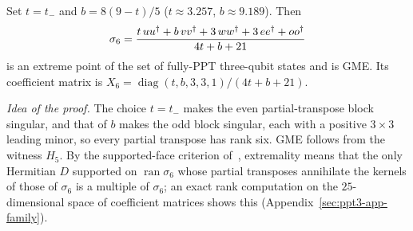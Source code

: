 \begin{corollary}\label{cor:ppt3-extreme6}
Set $t=t_-$ and $b=8(9-t)/5$ ($t\approx3.257$, $b\approx9.189$). Then
\begin{equation}\label{eq:ppt3-sigma6}
\sigma_6=\frac{t\,uu^{\dagger}+b\,vv^{\dagger}+3\,ww^{\dagger}+3\,ee^{\dagger}+oo^{\dagger}}{4t+b+21}
\end{equation}
is an extreme point of the set of fully-PPT three-qubit states and is GME. Its coefficient matrix is
$X_6=\operatorname{diag}(t,b,3,3,1)/(4t+b+21)$.
\end{corollary}
\emph{Idea of the proof.} The choice $t=t_-$ makes the even partial-transpose block singular, and that of $b$ makes the odd
block singular, each with a positive $3\times3$ leading minor, so every partial transpose has rank six. GME follows from the
witness $H_5$. By the supported-face criterion of~\cite{GIM}, extremality means that the only Hermitian $D$ supported on
$\operatorname{ran}\sigma_6$ whose partial transposes annihilate the kernels of those of $\sigma_6$ is a multiple of
$\sigma_6$; an exact rank computation on the $25$-dimensional space of coefficient matrices shows this
(Appendix~\ref{sec:ppt3-app-family}).
